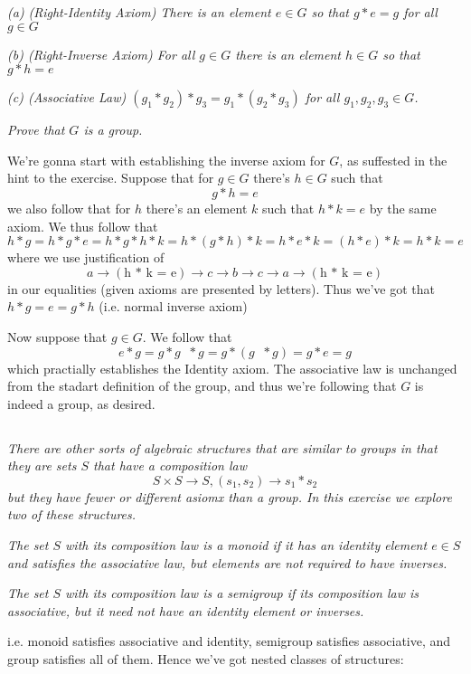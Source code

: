 \documentclass[11pt,oneside,titlepage]{book}
\DeclareMathOperator \inv {^{-1}}
\begin{document}
\textit{(a) (Right-Identity Axiom) There is an element $e \in G$ so
  that $g * e = g$ for all $g \in G$}

\textit{(b) (Right-Inverse Axiom) For all $g \in G$ there is an
  element $h \in G$ so that $g * h = e$}

\textit{(c) (Associative Law) $(g_1 * g_2) * g_3 = g_1 * (g_2 * g_3)$
for all $g_1, g_2, g_3 \in G$.}

\textit{Prove that $G$ is a group.}

We're gonna start with establishing the inverse axiom for $G$,
as suffested in the hint to the exercise.
Suppose that for $g \in G$ there's $h \in G$ such that 
$$g * h = e$$
we also follow that for $h$ there's an element $k$ such that
$h * k = e$ by the same axiom. We thus follow that
$$ h * g = h * g * e = h * g * h * k = h * (g * h) * k = h * e * k = (h * e) * k = h * k = e $$
where we use justification of
$$a \to (\text{h * k = e}) \to c \to b \to c \to a \to (\text{h * k = e})$$
in our equalities (given axioms are presented by letters).
Thus we've got that $h * g = e = g * h$ (i.e. normal inverse axiom)

Now suppose that $g \in G$. We follow that
$$e * g = g * g\inv * g = g * (g\inv * g) =  g * e = g$$
which practially establishes the Identity axiom. The associative law
is unchanged from the stadart definition of the group, and thus we're
following that $G$ is indeed a group, as desired.

\subsection{}

\textit{There are other sorts of algebraic structures that are similar to groups in that
  they are sets $S$ that have a composition law}
$$S \times S \to S, (s_1, s_2) \to s_1 * s_2$$
\textit{but they have fewer or different asiomx than a group. In this exercise we explore two
  of these structures.}

\textit{The set $S$ with its composition law is a monoid if it has an
identity element $e \in S$ and satisfies the associative law, but
elements are not required to have inverses.}

\textit{The set $S$ with its composition law is a semigroup if its
composition law is associative, but it need not have an identity
element or inverses.}

i.e. monoid satisfies associative and identity, semigroup satisfies associative,
and group satisfies all of them. Hence we've got nested classes of structures:
\end{document}
